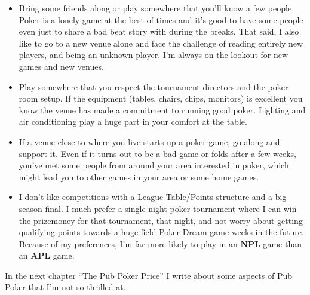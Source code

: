 \begin{itemize}
\item Bring some friends along or play somewhere that you'll
know a few people. Poker is a lonely game at the best
of times and it's good to have some people even just to share
a bad beat story with during the breaks. That said, I also like
to go to a new venue alone and face the challenge of
reading entirely new players, and being an unknown player.
I'm always on the lookout for new games and new venues.

\item Play somewhere that you respect the tournament directors
and the poker room setup. If the equipment (tables, chairs, chips,
monitors) is excellent you know the venue has made a commitment
to running good poker. Lighting and air conditioning
play a huge part in your comfort at the table.

\item If a venue close to where you live starts
up a poker game, go along and support it. Even if it turns out to
be a bad game or folds after a few weeks, you've met some people
from around your area interested in poker, which might lead
you to other games in your area or some home games.

\item I don't like competitions with a League Table/Points
structure and a big season final. I much prefer a single night poker
tournament where I can win the prizemoney for that tournament, that
night, and not worry about getting qualifying points towards a
huge field Poker Dream game weeks in the future. Because of my
preferences, I'm far more likely to play in an \textbf{NPL} game than
an \textbf{APL} game.

\end{itemize}

In the next chapter ``The Pub Poker Price'' I write about some
aspects of Pub Poker that I'm not so thrilled at.
